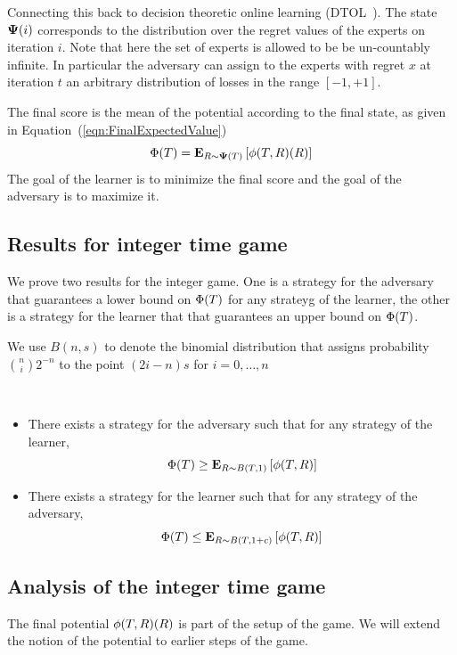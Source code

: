 \documentclass{article}[12pt]
\begin{document}
Connecting this back to decision theoretic online learning
(DTOL~\cite{}). The state ${\bf \Psi}(i)$ corresponds to the distribution
over the regret values of the experts on iteration $i$. Note that here the set of
experts is allowed to be be un-countably infinite. In particular the
adversary can assign to the experts with regret $x$ at iteration $t$
an arbitrary distribution of losses in the range $[-1,+1]$.

The final score is the mean of the potential according to the final
state, as given in
Equation~(\ref{eqn:FinalExpectedValue})
\begin{equation}
  \Phi(T) ={\bf E}_{R \sim {\bf \Psi}(T)}\left[ \phi(T,R)(R) \right]
\end{equation}
The goal of the learner is to minimize the final score and the goal of
the adversary is to maximize it.
\subsection{Results for integer time game}

We prove two results for the integer game. One is a strategy for the
adversary that guarantees a lower bound on $\Phi(T)$ for any
strateyg of the learner,  the other is a strategy for the learner that
that guarantees an upper bound on $\Phi(T)$.

We use $B(n,s)$ to denote the binomial distribution that assigns
probability ${n \choose i} 2^{-n}$ to the point $(2i-n)s$ for
$i=0,\ldots,n$

\begin{theorem}
  ~\\
  \begin{itemize}
    \item
    There exists a strategy for the adversary such that for any strategy
    of the learner, $$\Phi(T) \geq {\bf E}_{R \sim B(T,1)}\left[ \phi(T,R) \right]$$
  \item
    There exists a strategy for the learner such that for any strategy
    of the adversary, $$\Phi(T) \leq {\bf E}_{R \sim B(T,1+c)}\left[ \phi(T,R) \right]$$
  \end{itemize}
\end{theorem}

\subsection{Analysis of the integer time game}

The final potential $\phi(T,R)(R)$ is part of the setup of the
game. We will extend the notion of the potential to earlier steps of
the game.
\end{document}
